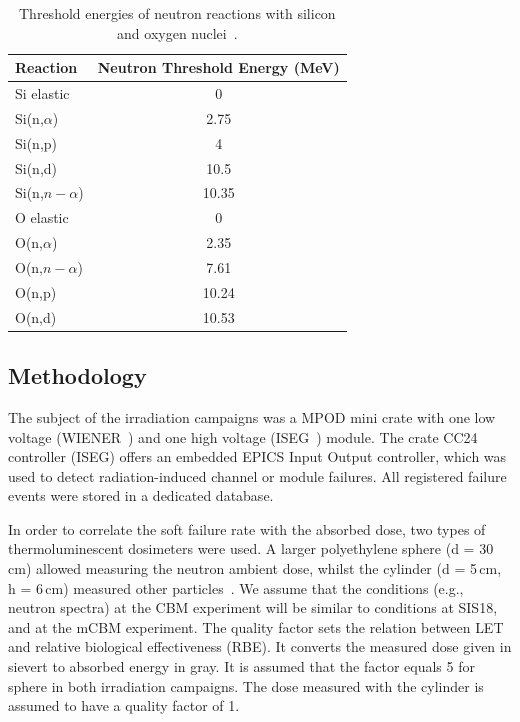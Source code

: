\begin{table}[!h]
\centering
\caption{Threshold energies of neutron reactions with silicon and oxygen nuclei~\cite{ENDF}.}
\begin{tabular}{lc}
\hline
Reaction         & Neutron Threshold Energy (MeV) \\ \hline
Si elastic       & 0                              \\
Si(n,$\alpha$)   & 2.75                           \\
Si(n,p)          & 4                              \\
Si(n,d)          & 10.5                           \\
Si(n,$n-\alpha$) & 10.35                          \\ \hline
O elastic        & 0                              \\
O(n,$\alpha$)    & 2.35                           \\
O(n,$n-\alpha$)  & 7.61                           \\
O(n,p)           & 10.24                          \\
O(n,d)           & 10.53                         
\end{tabular}

\label{cross-seciton}
\end{table}


\subsection{Methodology}

The subject of the irradiation campaigns was a MPOD mini crate with one low voltage (WIENER~\cite{wiener}) and one high voltage (ISEG~\cite{iseg}) module. The crate CC24 controller (ISEG) offers an embedded \gls{EPICS} Input Output controller, which was used to detect radiation-induced channel or module failures. All registered  failure events were stored in a dedicated database.  

In order to correlate the soft failure rate with the absorbed dose, two types of thermoluminescent dosimeters were used. A larger polyethylene sphere (d = 30\,cm) allowed measuring the neutron ambient dose, whilst the cylinder (d = 5\,cm, h = 6\,cm) measured other particles~\cite{bonner}. We assume that the conditions (e.g., neutron spectra) at the \gls{CBM} experiment will be similar to conditions at SIS18, and at the \gls{mCBM} experiment. The quality factor sets the relation between \gls{LET} and relative biological effectiveness (\gls{RBE}). It converts the measured dose given in sievert to absorbed energy in gray. It is assumed that the factor equals 5 for sphere in both irradiation campaigns. The dose measured with the cylinder is assumed to have a quality factor of 1.

